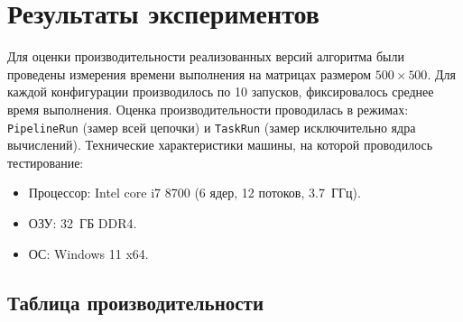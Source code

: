 \documentclass[14pt,a4paper]{extarticle}
\begin{document}
\section{Результаты экспериментов}

Для оценки производительности реализованных версий алгоритма были проведены измерения времени выполнения на матрицах размером $500 \times 500$. 
Для каждой конфигурации производилось по 10 запусков, фиксировалось среднее время выполнения. Оценка производительности проводилась в режимах: \texttt{PipelineRun} (замер всей цепочки) и \texttt{TaskRun} (замер исключительно ядра вычислений). Технические характеристики машины, на которой проводилось тестирование:

\begin{itemize}
    \item Процессор: Intel core i7 8700 (6 ядер, 12 потоков, 3.7~ГГц).
    \item ОЗУ: 32~ГБ DDR4.
    \item ОС: Windows 11 x64.
\end{itemize}
\newpage

\subsection{Таблица производительности}
\end{document}

